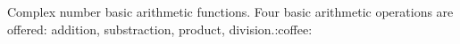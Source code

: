 Complex number basic arithmetic functions. Four basic arithmetic operations are offered\+: addition, substraction, product, division.\+:coffee\+: 